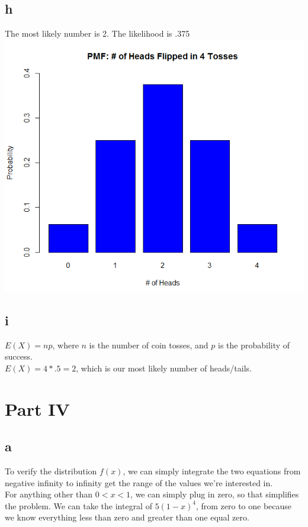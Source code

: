 \documentclass[10pt,letterpaper]{article}
\begin{document}
\subsection*{h}
The most likely number is 2. The likelihood is .375\\
\includegraphics[scale=.75]{CoinPMF}

\subsection*{i}
$E(X)=np$, where $n$ is the number of coin tosses, and $p$ is the probability
of success.\\
$E(X)=4*.5=2$, which is our most likely number of heads/tails.

\section*{Part IV}
\subsection*{a}
To verify the distribution $f(x)$, we can simply integrate the two equations
from negative infinity to infinity get the range of the values we're interested
in.\\

For anything other than $0 < x < 1$, we can simply plug in zero, so that
simplifies the problem. We can take the integral of $5(1-x)^4$, from zero
to one because we know everything less than zero and greater than one equal
zero.\\
\end{document}

